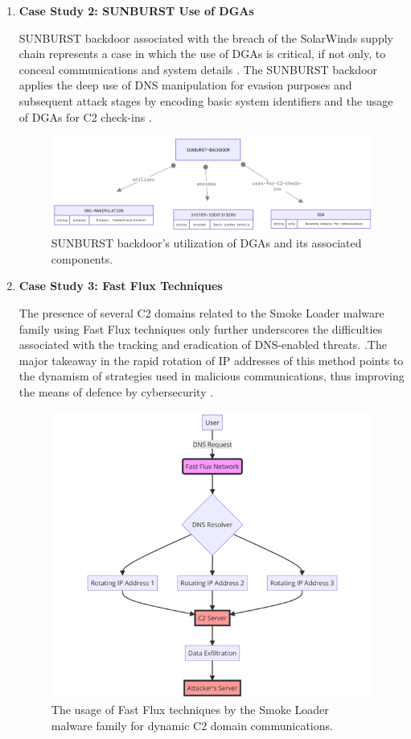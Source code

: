 \begin{enumerate}
\item\textbf{ Case Study 2: SUNBURST Use of DGAs}

SUNBURST backdoor associated with the breach of the SolarWinds supply chain represents a case in which the use of DGAs is critical, if not only, to conceal communications and system details \cite{paloaltonetworks2021dnsattacks}. The SUNBURST backdoor applies the deep use of DNS manipulation for evasion purposes and subsequent attack stages by encoding basic system identifiers and the usage of DGAs for C2 check-ins \cite{unit42_solarstorm_2021}.

\captionsetup{font= footnotesize}
\begin{figure}[H] 
    \centering
    \includegraphics[width=0.8\linewidth]{background/SUNDNS.png}
    \caption{SUNBURST backdoor's utilization of DGAs and its associated components.}
    \label{fig:figEleven}
\end{figure}

\item\textbf{ Case Study 3: Fast Flux Techniques}

The presence of several C2 domains related to the Smoke Loader malware family using Fast Flux techniques only further underscores the difficulties associated with the tracking and eradication of DNS-enabled threats. \cite{paloaltonetworks2021dnsattacks}.The major takeaway in the rapid rotation of IP addresses of this method points to the dynamism of strategies used in malicious communications, thus improving the means of defence by cybersecurity \cite{unit42_fastflux_2021}.

\captionsetup{font= footnotesize}
\begin{figure}[H]
    \centering
    \includegraphics[width=0.8\linewidth]{background/FastFluDNS.png}
    \caption{The usage of Fast Flux techniques by the Smoke Loader malware family for dynamic C2 domain communications.}
    \label{fig:figTweleve}
\end{figure}



\end{enumerate}
